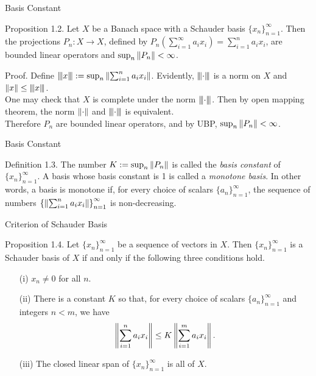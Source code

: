 \documentclass{beamer}
\begin{document}
\begin{frame}{Basis Constant}
    \begin{block}{Proposition 1.2.}
        Let $X$ be a Banach space with a Schauder basis $\{x_n\}_{n=1}^\infty$.
	  Then the projections $P_n:X\to X$, defined by $P_n\left(\sum_{i=1}^\infty a_ix_i\right)=\sum_{i=1}^n a_ix_i$,
	  are bounded linear operators and $\sup_n\left\lVert P_n \right\rVert<\infty$.
    \end{block}
    Proof. Define $\left\lvert\kern-0.25ex\left\lvert\kern-0.25ex\left\lvert x \right\rvert\kern-0.25ex\right\rvert\kern-0.25ex\right\rvert:=\sup_n\left\lVert \sum_{i=1}^n a_ix_i \right\rVert$.
	Evidently, $\left\lvert\kern-0.25ex\left\lvert\kern-0.25ex\left\lvert \cdot \right\rvert\kern-0.25ex\right\rvert\kern-0.25ex\right\rvert$ is a norm on $X$ and $\left\lVert x \right\rVert\leq\left\lvert\kern-0.25ex\left\lvert\kern-0.25ex\left\lvert x \right\rvert\kern-0.25ex\right\rvert\kern-0.25ex\right\rvert$.\\
	One may check that $X$ is complete under the norm $\left\lvert\kern-0.25ex\left\lvert\kern-0.25ex\left\lvert \cdot \right\rvert\kern-0.25ex\right\rvert\kern-0.25ex\right\rvert$.
	Then by open mapping theorem, the norm $\left\lVert \cdot \right\rVert$ and $\left\lvert\kern-0.25ex\left\lvert\kern-0.25ex\left\lvert \cdot \right\rvert\kern-0.25ex\right\rvert\kern-0.25ex\right\rvert$ is equivalent.\\
	Therefore $P_n$ are bounded linear operators, and by UBP, $\sup_n\left\lVert P_n \right\rVert<\infty$.
\end{frame}
\begin{frame}{Basis Constant}
    \begin{block}{Definition 1.3.}
        The number $K:=\sup_n\left\lVert P_n \right\rVert$ is called the \textit{basis constant} of $\{x_n\}_{n=1}^\infty$.
        A basis whose basis constant is 1 is called a \textit{monotone basis}.
        In other words, a basis is monotone if, for every choice of scalars $\{a_n\}_{n=1}^\infty$, the sequence of numbers $\left\{\left\lVert \sum_{i=1}^n a_ix_i \right\rVert\right\}_{n=1}^\infty$ is non-decreasing.
    \end{block}
\end{frame}
\begin{frame}{Criterion of Schauder Basis}
    \begin{block}{Proposition 1.4.}
        Let $\{x_n\}_{n=1}^\infty$ be a sequence of vectors in $X$.
	Then $\{x_n\}_{n=1}^\infty$ is a Schauder basis of $X$ if and only if the following three conditions hold.
\begin{itemize}
    \item[(i)] $x_n\neq0$ for all $n$.
    \item[(ii)] There is a constant $K$ so that, for every choice of scalars $\{a_n\}_{n=1}^\infty$
		and integers $n<m$, we have $$\left\lVert \sum_{i=1}^n a_ix_i \right\rVert\leq K\left\lVert \sum_{i=1}^m a_ix_i \right\rVert.$$
	\item[(iii)] The closed linear span of $\{x_n\}_{n=1}^\infty$ is all of $X$.
\end{itemize}
    \end{block}
\end{frame}
\end{document}
